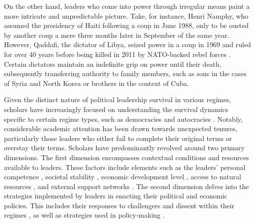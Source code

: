 \documentclass[
  12pt,
  a4paper,
  12pt]{article}
\begin{document}
On the other hand, leaders who come into power through irregular means
paint a more intricate and unpredictable picture. Take, for instance,
Henri Namphy, who assumed the presidency of Haiti following a coup in
June 1988, only to be ousted by another coup a mere three months later
in September of the same year. However, Qaddafi, the dictator of Libya,
seized power in a coup in 1969 and ruled for over 40 years before being
killed in 2011 by NATO-backed rebel forces \citep{goemans2009}. Certain
dictators maintain an indefinite grip on power until their death,
subsequently transferring authority to family members, such as sons in
the cases of Syria and North Korea or brothers in the context of Cuba.

Given the distinct nature of political leadership survival in various
regimes, scholars have increasingly focused on understanding the
survival dynamics specific to certain regime types, such as democracies
\citep{svolik2014} and autocracies \citep{davenport2021}. Notably,
considerable academic attention has been drawn towards unexpected
tenures, particularly those leaders who either fail to complete their
original terms or overstay their terms. Scholars have predominantly
revolved around two primary dimensions. The first dimension encompasses
contextual conditions and resources available to leaders. These factors
include elements such as the leaders' personal competence
\citep{yu2016}, societal stability \citep{arriola2009}, economic
development level \citep{palmer1999, williams2011}, access to natural
resources \citep{smith2004, quirozflores2012}, and external support
networks \citep{licht2009, wright2008, thyne2017}. The second dimension
delves into the strategies implemented by leaders in enacting their
political and economic policies. This includes their responses to
challengers and dissent within their regimes
\citep{escribà-folch2013, davenport2021}, as well as strategies used in
policy-making \citep{gandhi2007, morrison2009}.
\end{document}
